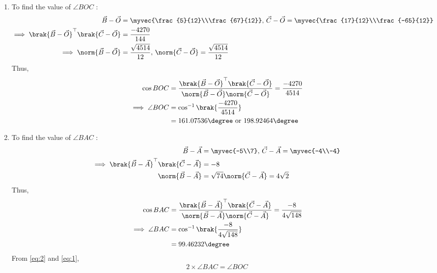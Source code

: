 \solution
\begin{enumerate}
\item To find  the value of $\angle{BOC}$ :
\begin{align}
\vec{B}-\vec{O}
          &=\myvec{\frac{5}{12}\\\frac{67}{12}},\,
\vec{C}-\vec{O}
          =\myvec{\frac{17}{12}\\\frac{-65}{12}}
	  \\
\implies \brak{\vec{B}-\vec{O}}^{\top}\brak{\vec{C}-\vec{O}}&=\frac{-4270}{144}\\
	\implies \norm{\vec{B}-\vec{O}}&= \frac{\sqrt{4514}}{12},\,
	\norm{\vec{C}-\vec{O}}= \frac{\sqrt{4514}}{12}
\end{align}
Thus,
\begin{align}
\cos{BOC}&=\frac{\brak{\vec{B}-\vec{O}}^{\top}\brak{\vec{C}-\vec{O}}}{\norm{\vec{B}-\vec{O}}\norm{\vec{C}-\vec{O}}}
=\frac{-4270}{4514}\\
\implies\angle{BOC}&=\cos^{-1}\brak{\frac{-4270}{4514}}
\\
	&=161.07536\degree
	\text{ or }
	198.92464\degree\label{eq:1}
\end{align}
	\item To find  the value of $\angle{BAC}$ :
\begin{align}
\vec{B}-\vec{A}&=\myvec{-5\\7},\,
\vec{C}-\vec{A}=\myvec{-4\\-4}
\\
\implies \brak{\vec{B}-\vec{A}}^{\top}\brak{\vec{C}-\vec{A}}&=-8
\\
	\norm{\vec{B}-\vec{A}}&= \sqrt{74}
	\norm{\vec{C}-\vec{A}}= 4\sqrt{2}
\end{align}
Thus,
\begin{align}
\cos{BAC}&=\frac{\brak{\vec{B}-\vec{A}}^{\top}\brak{\vec{C}-\vec{A}}}{\norm{\vec{B}-\vec{A}}\norm{\vec{C}-\vec{A}}}
=\frac{-8}{4\sqrt{148}}\\
\implies\angle{BAC}&=\cos^{-1}\brak{\frac{-8}{4\sqrt{148}}}\\
&=99.46232\degree \label{eq:2}
\end{align}
From \eqref{eq:2} and \eqref{eq:1},
\begin{align}
2\times\angle{BAC}
= \angle{BOC}
\end{align}
\end{enumerate}





